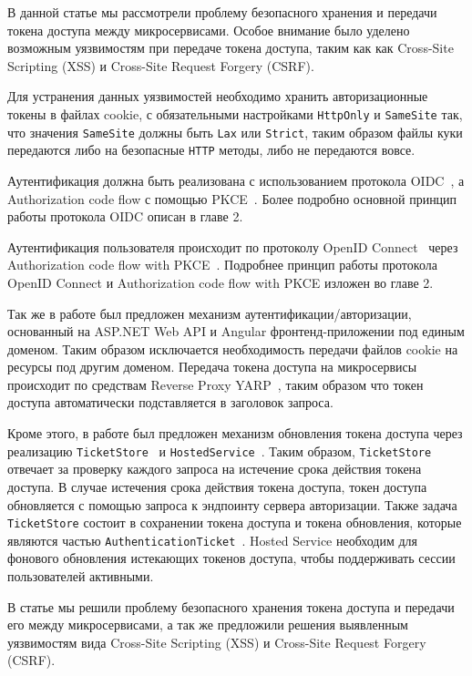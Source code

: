 В данной статье мы рассмотрели проблему безопасного хранения и передачи токена доступа между микросервисами.
Особое внимание было уделено возможным уязвимостям при передаче токена доступа,
таким как как Cross-Site Scripting (XSS) и Cross-Site Request Forgery (CSRF).

Для устранения данных уязвимостей необходимо хранить авторизационные токены в файлах cookie, с обязательными
настройками \texttt{HttpOnly} и \texttt{SameSite} так, что значения \texttt{SameSite} должны быть \texttt{Lax}
или \texttt{Strict}, таким образом файлы куки передаются либо на безопасные \texttt{HTTP} методы, либо не передаются вовсе.

Аутентификация должна быть реализована с использованием протокола OIDC~\cite{siriwardenaOpenid2020, sakimuraOpenid2014},
а Authorization code flow с помощью PKCE~\cite{bradley2015rfc}.
Более подробно основной принцип работы протокола OIDC описан в главе 2.

Аутентификация пользователя происходит по протоколу OpenID Connect~\cite{siriwardenaOpenid2020, sakimuraOpenid2014}
через Authorization code flow with PKCE~\cite{bradley2015rfc}.
Подробнее принцип работы протокола OpenID Connect и Authorization code flow with PKCE изложен во главе 2.

Так же в работе был предложен механизм аутентификации/авторизации, основанный на ASP.NET Web API и Angular
фронтенд-приложении под единым доменом.
Таким образом исключается необходимость передачи файлов cookie на ресурсы под другим доменом.
Передача токена доступа на микросервисы происходит по средствам Reverse Proxy YARP~\cite{microsoftYarp2021}, таким образом что
токен доступа автоматически подставляется в заголовок запроса.

Кроме этого, в работе был предложен механизм обновления токена доступа через
реализацию \texttt{TicketStore}~\cite{microsoftIticketstore2023} и \texttt{HostedService}~\cite{microsoftHostedservice2023}.
Таким образом, \texttt{TicketStore} отвечает за проверку каждого запроса на истечение срока действия токена доступа.
В случае истечения срока действия токена доступа, токен доступа обновляется с помощью запроса к эндпоинту сервера авторизации.
Также задача \texttt{TicketStore} состоит в сохранении токена доступа и токена обновления, которые являются
частью \texttt{AuthenticationTicket}~\cite{microsoftAuthenticationTicket2023}.
Hosted Service необходим для фонового обновления истекающих токенов доступа, чтобы поддерживать сессии пользователей активными.

В статье мы решили проблему безопасного хранения токена доступа и передачи его между микросервисами,
а так же предложили решения выявленным уязвимостям вида Cross-Site Scripting (XSS) и Cross-Site Request Forgery (CSRF).